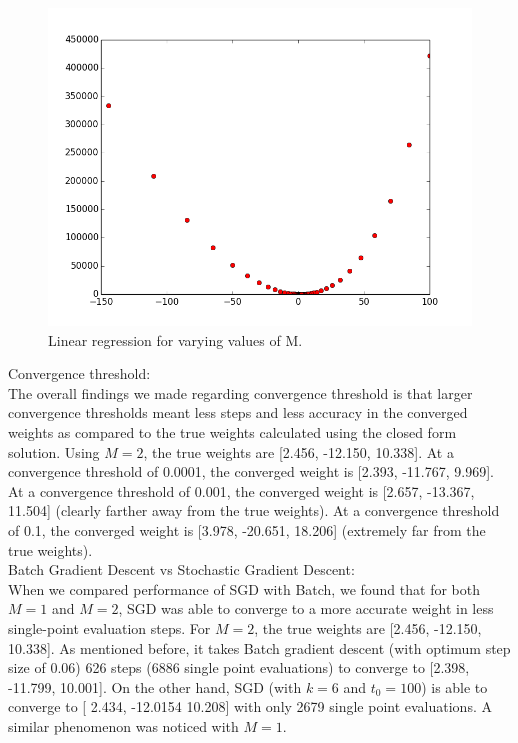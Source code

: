 \documentclass{article}
\begin{document}
\begin{figure}[width=\linewidth]
\centering
\includegraphics[width=1.2\linewidth]{code/P2/oscillation.png}
\caption{Linear regression for varying values of M.}
\end{figure}

Convergence threshold:\\
The overall findings we made regarding convergence threshold is that larger convergence thresholds meant less steps and less accuracy in the converged weights as compared to the true weights calculated using the closed form solution. Using $M = 2$, the true weights are [2.456, -12.150, 10.338]. At a convergence threshold of 0.0001, the converged weight is [2.393, -11.767, 9.969]. At a convergence threshold of 0.001, the converged weight is [2.657, -13.367, 11.504] (clearly farther away from the true weights). At a convergence threshold of 0.1, the converged weight is [3.978, -20.651, 18.206] (extremely far from the true weights).\\

Batch Gradient Descent vs Stochastic Gradient Descent: \\

When we compared performance of SGD with Batch, we found that for both $M = 1$ and $M = 2$, SGD was able to converge to a more accurate weight in less single-point evaluation steps. For $M = 2$, the true weights are [2.456, -12.150, 10.338]. As mentioned before, it takes Batch gradient descent (with optimum step size of 0.06) 626 steps (6886 single point evaluations) to converge to [2.398, -11.799, 10.001]. On the other hand, SGD (with $k = 6$ and $t_{0} = 100$) is able to converge to [ 2.434, -12.0154  10.208] with only 2679 single point evaluations. A similar phenomenon was noticed with $M = 1$. 
\end{document}
